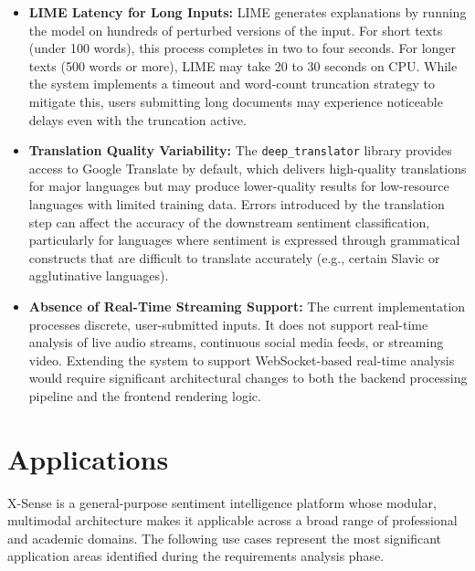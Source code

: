 \documentclass[12pt, a4paper]{report}
\begin{document}
\begin{itemize}[noitemsep, leftmargin=1.5em]
    \item \textbf{LIME Latency for Long Inputs:} LIME generates explanations by running the model on hundreds of perturbed versions of the input. For short texts (under 100 words), this process completes in two to four seconds. For longer texts (500 words or more), LIME may take 20 to 30 seconds on CPU. While the system implements a timeout and word-count truncation strategy to mitigate this, users submitting long documents may experience noticeable delays even with the truncation active.

    \item \textbf{Translation Quality Variability:} The \texttt{deep\_translator} library provides access to Google Translate by default, which delivers high-quality translations for major languages but may produce lower-quality results for low-resource languages with limited training data. Errors introduced by the translation step can affect the accuracy of the downstream sentiment classification, particularly for languages where sentiment is expressed through grammatical constructs that are difficult to translate accurately (e.g., certain Slavic or agglutinative languages).

    \item \textbf{Absence of Real-Time Streaming Support:} The current implementation processes discrete, user-submitted inputs. It does not support real-time analysis of live audio streams, continuous social media feeds, or streaming video. Extending the system to support WebSocket-based real-time analysis would require significant architectural changes to both the backend processing pipeline and the frontend rendering logic.
\end{itemize}

\section{Applications}

X-Sense is a general-purpose sentiment intelligence platform whose modular, multimodal architecture makes it applicable across a broad range of professional and academic domains. The following use cases represent the most significant application areas identified during the requirements analysis phase.
\end{document}

